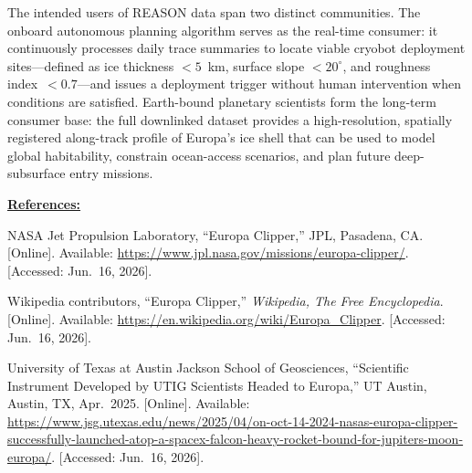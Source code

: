 \documentclass[11pt]{article}
\begin{document}
\begin{enumerate}[label=\Roman*., leftmargin=2.5em, itemsep=0.75em]
    The intended users of REASON data span two distinct communities. The onboard
    autonomous planning algorithm serves as the real-time consumer: it continuously
    processes daily trace summaries to locate viable cryobot deployment sites---defined
    as ice thickness ${<}5$~km, surface slope ${<}20^{\circ}$, and roughness
    index~${<}0.7$---and issues a deployment trigger without human intervention when
    conditions are satisfied. Earth-bound planetary scientists form the long-term consumer
    base: the full downlinked dataset provides a high-resolution, spatially registered
    along-track profile of Europa's ice shell that can be used to model global
    habitability, constrain ocean-access scenarios, and plan future deep-subsurface entry
    missions.

\end{enumerate}

\bigskip

\noindent\textbf{\underline{References:}}

\begin{enumerate}[label={[\arabic*]}, leftmargin=3em, itemsep=0.25em]

    \item NASA Jet Propulsion Laboratory, ``Europa Clipper,'' JPL, Pasadena, CA.
    [Online]. Available: \url{https://www.jpl.nasa.gov/missions/europa-clipper/}.
    [Accessed: Jun.\ 16, 2026].

    \item Wikipedia contributors, ``Europa Clipper,'' \textit{Wikipedia, The Free
    Encyclopedia}. [Online]. Available:
    \url{https://en.wikipedia.org/wiki/Europa_Clipper}.
    [Accessed: Jun.\ 16, 2026].

    \item University of Texas at Austin Jackson School of Geosciences,
    ``Scientific Instrument Developed by UTIG Scientists Headed to Europa,''
    UT Austin, Austin, TX, Apr.\ 2025. [Online]. Available:
    \url{https://www.jsg.utexas.edu/news/2025/04/on-oct-14-2024-nasas-europa-clipper-successfully-launched-atop-a-spacex-falcon-heavy-rocket-bound-for-jupiters-moon-europa/}.
    [Accessed: Jun.\ 16, 2026].

\end{enumerate}
\end{document}
